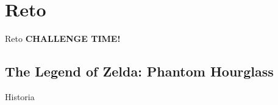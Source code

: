\section{Reto}
\begin{frame}{Reto}
    \Huge\centering\textbf{CHALLENGE TIME!}
\end{frame}

\subsection{The Legend of Zelda: Phantom Hourglass}
\begin{frame}{Historia}
\end{frame}
